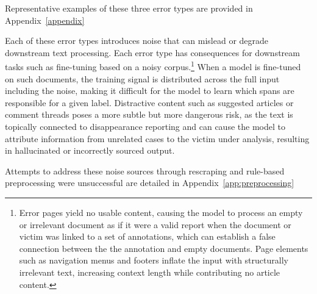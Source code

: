 \documentclass{article}
\begin{document}
Representative examples of these three error types are provided in Appendix~\ref{appendix}
 
Each of these error types introduces noise that can mislead or
degrade downstream text processing. Each error type has consequences for downstream tasks such as fine-tuning based on a noisy corpus.\footnote{Error pages yield no usable content, causing the model to process an empty or irrelevant document as if it were a valid report when the document or victim was linked to a set of annotations, which can establish a false connection
between the the annotation and empty documents. Page elements such as
navigation menus and footers inflate the input with structurally
irrelevant text, increasing context length while contributing no article
content.} When a model is fine-tuned on such documents, the training
signal is distributed across the full input including the noise, making
it difficult for the model to learn which spans are responsible for a
given label. Distractive content such as suggested articles or comment
threads poses a more subtle but more dangerous risk, as the text is
topically connected to disappearance reporting and can cause the model
to attribute information from unrelated cases to the victim under
analysis, resulting in hallucinated or incorrectly sourced output.

Attempts to address these noise sources through rescraping and rule-based preprocessing were unsuccessful are detailed in Appendix~\ref{app:preprocessing}



\end{document}
